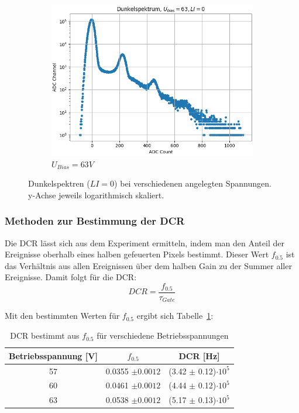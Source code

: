 \documentclass[12pt]{article}
\begin{document}
\begin{figure}[h!]
\begin{subfigure}{0.32\textwidth}
    \includegraphics[width=\textwidth]{Grafiken/dunkel_63}
    \caption{$U_{Bias} = 63V$}
  \end{subfigure}
  \caption{Dunkelspektren ($LI=0$) bei verschiedenen angelegten Spannungen.
  y-Achse jeweils logarithmisch skaliert. }
  \label{Dunkelspektren}
\end{figure}

\subsubsection{Methoden zur Bestimmung der DCR}



Die DCR lässt sich aus dem Experiment ermitteln, indem man den Anteil der Ereignisse oberhalb eines halben gefeuerten Pixels bestimmt. Dieser Wert $f_{0.5}$ ist das Verhältnis aus allen Ereignissen über dem halben Gain zu der Summer aller Ereignisse.
Damit folgt für die DCR:
\begin{equation}
    DCR = \frac{f_{0.5}}{\tau_{Gate}}
\end{equation}

Mit den bestimmten Werten für $f_{0.5}$ ergibt sich Tabelle~\ref{DCRBestimmung1}:

\begin{table}[h]
  \begin{center}
    \begin{tabular}{|c|c|c|}
      \hline
      Betriebsspannung [V] & $f_{0.5}$ & DCR [Hz] \\
      \hline
      57 & 0.0355 $\pm 0.0012$ & (3.42 $\pm$ 0.12)$\cdot 10^{5}$ \\
      60 & 0.0461 $\pm 0.0012$ & (4.44 $\pm$ 0.12)$\cdot 10^{5}$ \\
      63 & 0.0538 $\pm 0.0012$ & (5.17 $\pm$ 0.13)$\cdot 10^{5}$ \\
      \hline
    \end{tabular}
    \caption{DCR bestimmt aus $f_{0.5}$ für verschiedene Betriebsspannungen}
    \label{DCRBestimmung1}
  \end{center}
\end{table}
\end{document}
